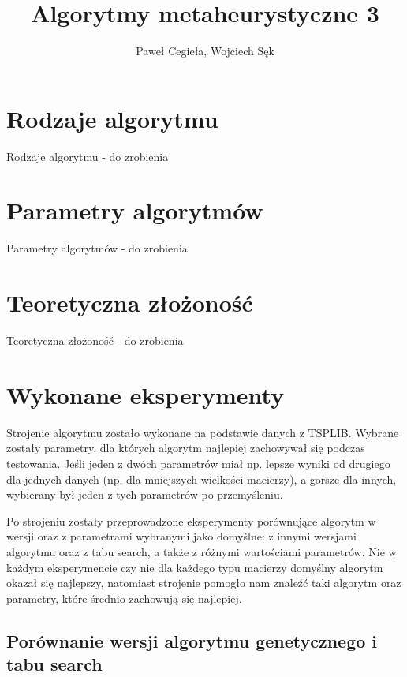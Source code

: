 \documentclass{article}
\title{Algorytmy metaheurystyczne 3}
\author{Paweł Cegieła, Wojciech Sęk}
\begin{document}
 

\maketitle

\section{Rodzaje algorytmu}
Rodzaje algorytmu - do zrobienia

\section{Parametry algorytmów}
Parametry algorytmów - do zrobienia

\section{Teoretyczna złożoność}
Teoretyczna złożoność - do zrobienia

\section{Wykonane eksperymenty}

Strojenie algorytmu zostało wykonane na podstawie danych z TSPLIB. Wybrane zostały parametry, dla których algorytm najlepiej zachowywał się podczas testowania. Jeśli jeden z dwóch parametrów miał np. lepsze wyniki od drugiego dla jednych danych (np. dla mniejszych wielkości macierzy), a gorsze dla innych, wybierany był jeden z tych parametrów po przemyśleniu.

Po strojeniu zostały przeprowadzone eksperymenty porównujące algorytm w wersji oraz z parametrami wybranymi jako domyślne: z innymi wersjami algorytmu oraz z tabu search, a także z różnymi wartościami parametrów. Nie w każdym eksperymencie czy nie dla każdego typu macierzy domyślny algorytm okazał się najlepszy, natomiast strojenie pomogło nam znaleźć taki algorytm oraz parametry, które średnio zachowują się najlepiej.

\subsection{Porównanie wersji algorytmu genetycznego i tabu search}
\end{document}
